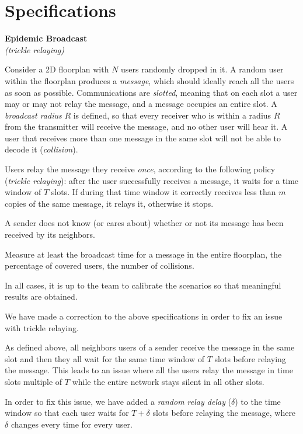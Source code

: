 \chapter{Specifications}\label{ch:specs}

\begin{center}
	\Large \textbf{Epidemic Broadcast}\\
	\normalsize \textit{(trickle relaying)}
\end{center}

\noindent Consider a 2D floorplan with \(N\) users randomly dropped in it. A
random user within the floorplan produces a \emph{message}, which should ideally
reach all the users as soon as possible. Communications are \emph{slotted},
meaning that on each slot a user may or may not relay the message, and a message
occupies an entire slot. A \emph{broadcast radius} \(R\) is defined, so that
every receiver who is within a radius \(R\) from the transmitter will receive
the message, and no other user will hear it. A user that receives more than one
message in the same slot will not be able to decode it (\emph{collision}).

Users relay the message they receive \emph{once}, according to the following
policy (\emph{trickle relaying}): after the user successfully receives a
message, it waits for a time window of \(T\) slots. If during that time window
it correctly receives less than \(m\) copies of the same message, it relays it,
otherwise it stops.

A sender does not know (or cares about) whether or not its message has been
received by its neighbors.

Measure at least the broadcast time for a message in the entire floorplan, the
percentage of covered users, the number of collisions.

In all cases, it is up to the team to calibrate the scenarios so that meaningful
results are obtained.

\begin{tcolorbox}[title=Note]
	We have made a correction to the above specifications in order to fix an
	issue with trickle relaying.

	As defined above, all neighbors users of a sender receive the message in
	the same slot and then they all wait for the same time window of \(T\)
	slots before relaying the message. This leads to an issue where all the
	users relay the message in time slots multiple of \(T\) while the entire
	network stays silent in all other slots.

	In order to fix this issue, we have added a \emph{random relay delay}
	(\(\delta\)) to the time window so that each user waits for \(T+\delta\)
	slots before relaying the message, where \(\delta\) changes every time
	for every user.
\end{tcolorbox}
